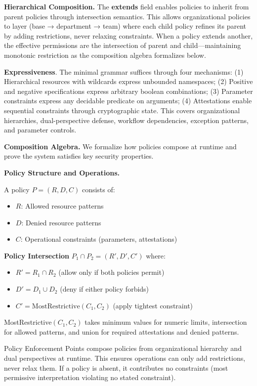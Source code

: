 \noindent\textbf{Hierarchical Composition.} The \textbf{extends} field enables policies to inherit from parent policies through intersection semantics. This allows organizational policies to layer (base → department → team) where each child policy refines its parent by adding restrictions, never relaxing constraints. When a policy extends another, the effective permissions are the intersection of parent and child—maintaining monotonic restriction as the composition algebra formalizes below.

\textbf{Expressiveness}. The minimal grammar suffices through four mechanisms: (1) Hierarchical resources with wildcards express unbounded namespaces; (2) Positive and negative specifications express arbitrary boolean combinations; (3) Parameter constraints express any decidable predicate on arguments; (4) Attestations enable sequential constraints through cryptographic state. This covers organizational hierarchies, dual-perspective defense, workflow dependencies, exception patterns, and parameter controls.

\textbf{Composition Algebra.} We formalize how policies compose at runtime and prove the system satisfies key security properties.

\textbf{Policy Structure and Operations.}

A policy $P = (R, D, C)$ consists of:
\begin{itemize}
\item $R$: Allowed resource patterns
\item $D$: Denied resource patterns
\item $C$: Operational constraints (parameters, attestations)
\end{itemize}

\textbf{Policy Intersection} $P_1 \cap P_2 = (R', D', C')$ where:
\begin{itemize}
\item $R' = R_1 \cap R_2$ (allow only if both policies permit)
\item $D' = D_1 \cup D_2$ (deny if either policy forbids)
\item $C' = \text{MostRestrictive}(C_1, C_2)$ (apply tightest constraint)
\end{itemize}

MostRestrictive$(C_1, C_2)$ takes minimum values for numeric limits, intersection for allowed patterns, and union for required attestations and denied patterns.

Policy Enforcement Points compose policies from organizational hierarchy and dual perspectives at runtime. This ensures operations can only add restrictions, never relax them. If a policy is absent, it contributes no constraints (most permissive interpretation violating no stated constraint).

